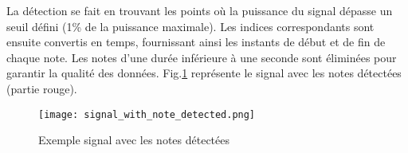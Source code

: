 
La détection se fait en trouvant les points où la puissance du signal dépasse un seuil défini (1\% de la puissance maximale). Les indices correspondants sont ensuite convertis en temps, fournissant ainsi les instants de début et de fin de chaque note. Les notes d'une durée inférieure à une seconde sont éliminées pour garantir la qualité des données. 
Fig.\ref{fig:Note_Detection} représente le signal avec les notes détectées (partie rouge).
\begin{figure}[htb]
    \centering
    \texttt{[image: signal\_with\_note\_detected.png]}
    \caption{Exemple signal avec les notes détectées}
    \label{fig:Note_Detection}
\end{figure}